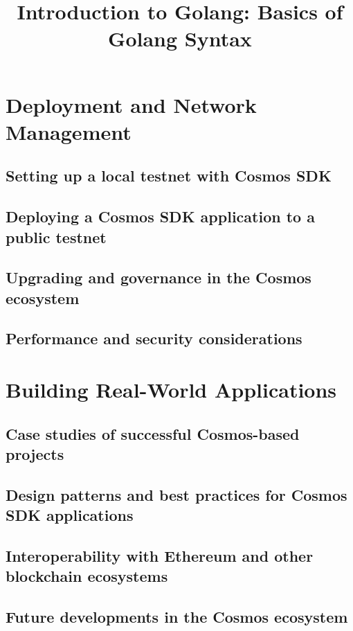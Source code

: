 \documentclass{article}
\begin{document}
\section{Deployment and Network Management}

\subsection{Setting up a local testnet with Cosmos SDK}
\subsection{Deploying a Cosmos SDK application to a public testnet}
\subsection{Upgrading and governance in the Cosmos ecosystem}
\subsection{Performance and security considerations}

\section{Building Real-World Applications}

\subsection{Case studies of successful Cosmos-based projects}
\subsection{Design patterns and best practices for Cosmos SDK applications}
\subsection{Interoperability with Ethereum and other blockchain ecosystems}
\subsection{Future developments in the Cosmos ecosystem}


\title{Introduction to Golang: Basics of Golang Syntax}
\end{document}
